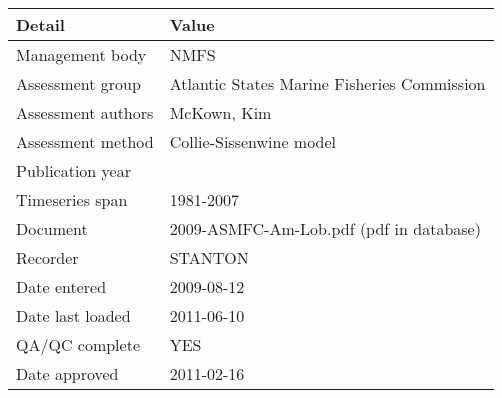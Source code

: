 \begin{table}[htb]
\centering
\begin{tabular}{lp{7cm}}
\toprule
Detail & Value \\
\midrule
Management body    & NMFS                                        \\
Assessment group   & Atlantic States Marine Fisheries Commission \\
Assessment authors & McKown, Kim                                 \\
Assessment method  & Collie-Sissenwine model                     \\
Publication year   &                                             \\
Timeseries span    & 1981-2007                                   \\
Document           & 2009-ASMFC-Am-Lob.pdf (pdf in database)     \\
Recorder           & STANTON                                     \\
Date entered       & 2009-08-12                                  \\
Date last loaded   & 2011-06-10                                  \\
QA/QC complete     & YES                                         \\
Date approved      & 2011-02-16                                  \\
\bottomrule
\end{tabular}
\label{tab:assessdet}
\end{table}
